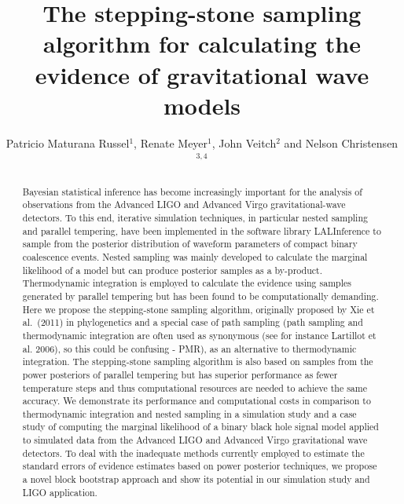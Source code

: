 \documentclass[aps,reprint,amsmath,amssymb,showpacs,showkeys]{revtex4-1}%
\newcommand{\cb}{ \color{blue}}
\begin{document}
\graphicspath{{figures/}}	

\title[Stepping-stone sampling algorithm for evidence computation]{The stepping-stone sampling algorithm for calculating the evidence of gravitational wave models}

\author{Patricio Maturana Russel$^{1}$, Renate Meyer$^1$, John Veitch$^2$ and Nelson Christensen$^{3,4}$}


\begin{abstract}
Bayesian statistical inference has become increasingly important for the analysis of observations from the Advanced LIGO and Advanced Virgo gravitational-wave detectors. To this end, iterative simulation techniques, in particular nested sampling and parallel tempering, have been implemented in the software library LALInference to sample from the posterior distribution of waveform parameters of compact binary coalescence events. Nested sampling was  mainly developed to calculate the marginal likelihood of a model but can produce posterior samples as a by-product. Thermodynamic integration is employed to calculate the evidence using samples generated by parallel tempering but has been found to be computationally demanding. Here we propose the stepping-stone sampling algorithm, originally proposed by Xie et al.\ (2011) in phylogenetics  and a special case of path sampling {\cb (path sampling and thermodynamic integration are often used as synonymous (see for instance Lartillot et al. 2006), so this could be confusing - PMR)}, as an alternative to thermodynamic integration.  The stepping-stone sampling algorithm is also based on samples from the power posteriors of parallel tempering but has  superior performance as fewer temperature steps and thus computational resources are needed to achieve the same accuracy.  We demonstrate its performance and computational costs in comparison to thermodynamic integration and nested sampling in a simulation study and a case study of computing the marginal likelihood of a binary black hole signal model applied to simulated data from the Advanced LIGO and Advanced Virgo gravitational wave detectors. To deal with the inadequate methods currently employed to estimate the standard errors of evidence estimates based on power posterior techniques, we propose a novel block bootstrap  approach and show its potential in our simulation study and LIGO application.
\end{abstract}
\end{document}
